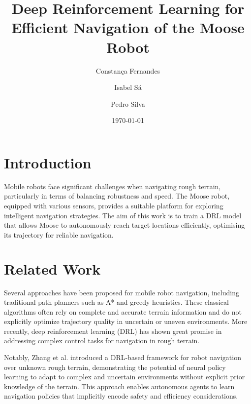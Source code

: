 \documentclass[11pt,twocolumn]{article}
\title{Deep Reinforcement Learning for Efficient Navigation of the Moose Robot}
\author{Constança Fernandes \and Isabel Sá \and Pedro Silva}
\date{\today}
\begin{document}

\section{Introduction}
Mobile robots face significant challenges when navigating rough terrain, particularly in terms of balancing robustness and speed. The Moose robot, equipped with various sensors, provides a suitable platform for exploring intelligent navigation strategies. The aim of this work is to train a DRL model that allows Moose to autonomously reach target locations efficiently, optimising its trajectory for reliable navigation.

\section{Related Work}

Several approaches have been proposed for mobile robot navigation, including traditional path planners such as A* and greedy heuristics. These classical algorithms often rely on complete and accurate terrain information and do not explicitly optimize trajectory quality in uncertain or uneven environments. More recently, deep reinforcement learning (DRL) has shown great promise in addressing complex control tasks for navigation in rough terrain.

Notably, Zhang et al. \cite{Zhang2018DRL} introduced a DRL-based framework for robot navigation over unknown rough terrain, demonstrating the potential of neural policy learning to adapt to complex and uncertain environments without explicit prior knowledge of the terrain. This approach enables autonomous agents to learn navigation policies that implicitly encode safety and efficiency considerations.
\end{document}

